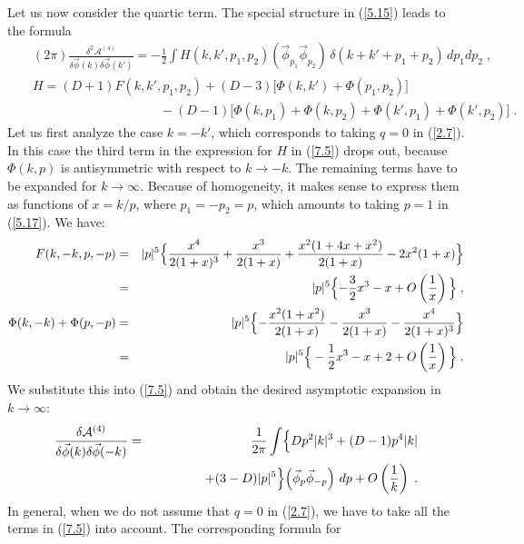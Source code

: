\documentclass[a4paper,12pt]{article}
\numberwithin{equation}{section}
\begin{document}
Let us now consider the quartic term. The special structure in (\ref{5.15})
leads to the formula
\begin{eqnarray}
 &  & (2\pi )\frac{\delta ^{2}\mathcal{A}^{(4)}}{\delta \vec{\phi }(k)\delta \vec{\phi }(k')}=-\frac{1}{2}\int H(k,k',p_{1},p_{2})\left( \vec{\phi }_{p_{1}}\vec{\phi }_{p_{2}}\right) \, \delta (k+k'+p_{1}+p_{2})\, dp_{1}dp_{2}\; ,\nonumber \\
 &  & H=(D+1)F(k,k',p_{1},p_{2})+(D-3)\bigl [\Phi (k,k')+\Phi (p_{1},p_{2})\bigr ]\nonumber \\
 &  & \qquad \qquad \qquad \qquad \qquad -(D-1)\bigr [\Phi (k,p_{1})+\Phi (k,p_{2})+\Phi (k',p_{1})+\Phi (k',p_{2})\bigl ]\; .\label{7.5} 
\end{eqnarray}
 Let us first analyze the case \( k=-k' \), which corresponds to taking \( q=0 \)
in (\ref{2.7}). In this case the third term in the expression for \( H \)
in (\ref{7.5}) drops out, because \( \Phi (k,p) \) is antisymmetric with respect
to \( k\to -k \). The remaining terms have to be expanded for \( k\to \infty . \)
Because of homogeneity, it makes sense to express them as functions of \( x=k/p \),
where \( p_{1}=-p_{2}=p \), which amounts to taking \( p=1 \) in (\ref{5.17}).
We have: 
\begin{eqnarray}
F(k,-k,p,-p) & = & |p|^{5}\Bigl \{\frac{x^{4}}{2(1+x)^{3}}+\frac{x^{3}}{2(1+x)}+\frac{x^{2}(1+4x+x^{2})}{2(1+x)}-2x^{2}(1+x)\Bigr \}\nonumber \\
 & = & |p|^{5}\Bigl \{-\frac{3}{2}x^{3}-x+O\left( \frac{1}{x}\right) \Bigl \}\; ,\nonumber \\
\Phi (k,-k)+\Phi (p,-p) & = & |p|^{5}\Bigl \{-\frac{x^{2}(1+x^{2})}{2(1+x)}-\frac{x^{3}}{2(1+x)}-\frac{x^{4}}{2(1+x)^{3}}\Bigr \}\nonumber \\
 & = & |p|^{5}\Bigr \{-\frac{1}{2}x^{3}-x+2+O\left( \frac{1}{x}\right) \Bigl \}\; .\nonumber \label{7.6} 
\end{eqnarray}
  We substitute this into (\ref{7.5}) and obtain the desired asymptotic expansion
in \( k\to \infty  \):
\begin{eqnarray}
\frac{\delta \mathcal{A}^{(4)}}{\delta \vec{\phi }(k)\delta \vec{\phi }(-k)} & = & \frac{1}{2\pi }\int \Bigl \{Dp^{2}|k|^{3}+(D-1)p^{4}|k|\nonumber \\
 &  & \qquad \qquad +(3-D)|p|^{5}\Bigl \}\left( \vec{\phi }_{p}\vec{\phi }_{-p}\right) \, dp+O\left( \frac{1}{k}\right) \; .\label{7.9} 
\end{eqnarray}
In general, when we do not assume that \( q=0 \) in (\ref{2.7}), we have to
take all the terms in (\ref{7.5}) into account. The corresponding formula for
\end{document}

